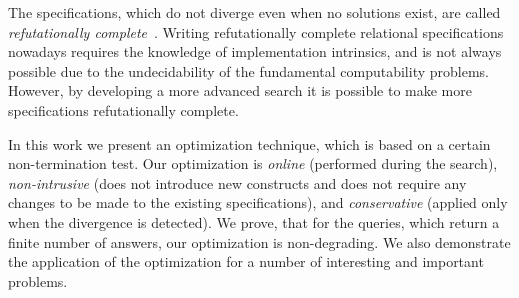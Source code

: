 The specifications, which do not diverge even when no solutions exist, are called \emph{refutationally complete}~\cite{WillThesis}. Writing 
refutationally complete relational specifications nowadays requires the knowledge of \miniKanren implementation intrinsics, and is not always
possible due to the undecidability of the fundamental computability problems. However, by developing a more advanced search it is possible
to make more specifications refutationally complete.

In this work we present an optimization technique, which is based on a certain non-termination test. Our optimization is \emph{online} (performed during the
search), \emph{non-intrusive} (does not introduce new constructs and does not require any changes to be made to the existing specifications), and \emph{conservative} 
(applied only when the divergence is detected). We prove, that for the queries, which return a finite number of answers, our optimization is non-degrading. 
We also demonstrate the application of the optimization for a number of interesting and important problems.